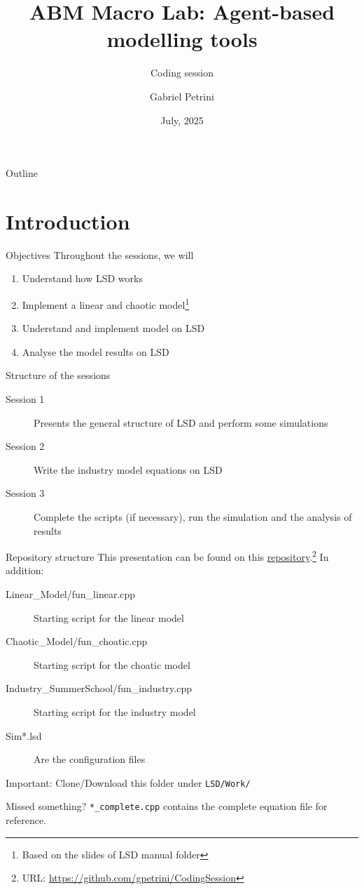 \documentclass[bigger,aspectratio=169]{beamer}
\author{Gabriel Petrini}
\date{July, 2025}
\title{ABM Macro Lab: Agent-based modelling tools}
\subtitle{Coding session}
\begin{document}
\maketitle
\begin{frame}{Outline}
\tableofcontents
\end{frame}

\section{Introduction}
\label{sec:org3482968}

\begin{frame}[label={sec:org7af456e}]{Objectives}
Throughout the sessions, we will

\begin{enumerate}
\item Understand how LSD works
\item Implement a linear and chaotic model\footnote{Based on the slides of LSD manual folder}
\item Understand and implement \textcite{dosi_2017_footprint} model on LSD
\item Analyse the model results on LSD
\end{enumerate}
\end{frame}
\begin{frame}[label={sec:orga838677}]{Structure of the sessions}
\begin{description}
\item[{Session 1}] Presents the general structure of LSD and perform some simulations
\item[{Session 2}] Write the industry model equations on LSD
\item[{Session 3}] Complete the scripts (if necessary), run the simulation and the analysis of results
\end{description}
\end{frame}
\begin{frame}[label={sec:orgd4cfd67},fragile]{Repository structure}
 This presentation can be found on this \href{https://github.com/gpetrini/CodingSession}{repository}.\footnote{URL: \url{https://github.com/gpetrini/CodingSession}} In addition:

\begin{description}
\item[{Linear\_Model/fun\_linear.cpp}] Starting script for the linear model
\item[{Chaotic\_Model/fun\_choatic.cpp}] Starting script for the choatic model
\item[{Industry\_SummerSchool/fun\_industry.cpp}] Starting script for the industry model
\item[{Sim*.lsd}] Are the configuration files
\end{description}

\alert{Important:} Clone/Download this folder under \texttt{LSD/Work/}
\begin{block}{Missed something?}
\texttt{*\_complete.cpp} contains the complete equation file for reference.
\end{block}
\end{frame}
\end{document}
